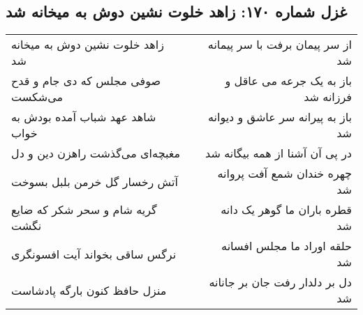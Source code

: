 \begin{center}
\section*{غزل شماره ۱۷۰: زاهد خلوت نشین دوش به میخانه شد}
\label{sec:sh170}
\begin{longtable}{l p{0.5cm} r}
زاهد خلوت نشین دوش به میخانه شد
&&
از سر پیمان برفت با سر پیمانه شد
\\
صوفی مجلس که دی جام و قدح می‌شکست
&&
باز به یک جرعه می عاقل و فرزانه شد
\\
شاهد عهد شباب آمده بودش به خواب
&&
باز به پیرانه سر عاشق و دیوانه شد
\\
مغبچه‌ای می‌گذشت راهزن دین و دل
&&
در پی آن آشنا از همه بیگانه شد
\\
آتش رخسار گل خرمن بلبل بسوخت
&&
چهره خندان شمع آفت پروانه شد
\\
گریه شام و سحر شکر که ضایع نگشت
&&
قطره باران ما گوهر یک دانه شد
\\
نرگس ساقی بخواند آیت افسونگری
&&
حلقه اوراد ما مجلس افسانه شد
\\
منزل حافظ کنون بارگه پادشاست
&&
دل بر دلدار رفت جان بر جانانه شد
\\
\end{longtable}
\end{center}
